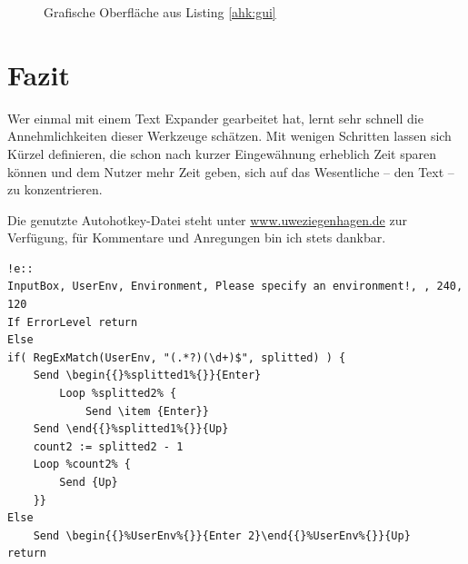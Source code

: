 \documentclass[ngerman]{dtk}%
\newcommand{\ahk}{Autohotkey\xspace}
\begin{document}
\begin{figure}[h]
\begin{center}
\caption{Grafische Oberfläche aus Listing \ref{ahk:gui}}\label{fig:gui}
\end{center}
\end{figure}

\section{Fazit}

Wer einmal mit einem Text Expander gearbeitet hat, lernt sehr schnell die Annehmlichkeiten dieser Werkzeuge schätzen. Mit wenigen Schritten lassen sich Kürzel definieren, die schon nach kurzer Eingewähnung erheblich Zeit sparen können und dem Nutzer mehr Zeit geben, sich auf das Wesentliche -- den Text -- zu konzentrieren.

Die genutzte Autohotkey-Datei steht unter \url{www.uweziegenhagen.de} zur Verfügung, für Kommentare und Anregungen bin ich stets dankbar.

\begin{lstlisting}[frame=single,caption={Oberfläche mit \ahk},basicstyle={\ttfamily\footnotesize},label={ahk:gui}]
!e::
InputBox, UserEnv, Environment, Please specify an environment!, , 240, 120
If ErrorLevel return
Else 
if( RegExMatch(UserEnv, "(.*?)(\d+)$", splitted) ) {
	Send \begin{{}%splitted1%{}}{Enter}
		Loop %splitted2% {
			Send \item {Enter}}
	Send \end{{}%splitted1%{}}{Up}
	count2 := splitted2 - 1 
	Loop %count2% {
		Send {Up}
	}} 
Else 
	Send \begin{{}%UserEnv%{}}{Enter 2}\end{{}%UserEnv%{}}{Up}
return
\end{lstlisting}
\end{document}
